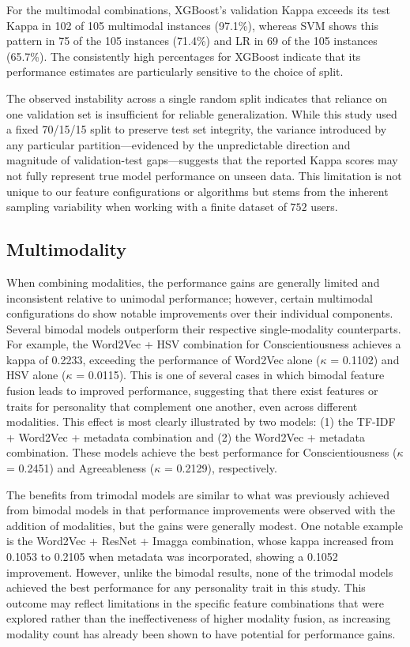 For the multimodal combinations, XGBoost's validation Kappa exceeds its test Kappa in 102 of 105 multimodal instances (97.1\%), whereas SVM shows this pattern in 75 of the 105 instances (71.4\%) and LR in 69 of the 105 instances (65.7\%). The consistently high percentages for XGBoost indicate that its performance estimates are particularly sensitive to the choice of split.

The observed instability across a single random split indicates that reliance on one validation set is insufficient for reliable generalization. While this study used a fixed 70/15/15 split to preserve test set integrity, the variance introduced by any particular partition---evidenced by the unpredictable direction and magnitude of validation-test gaps---suggests that the reported Kappa scores may not fully represent true model performance on unseen data. This limitation is not unique to our feature configurations or algorithms but stems from the inherent sampling variability when working with a finite dataset of $752$ users.

\subsection{Multimodality}
When combining modalities, the performance gains are generally limited and inconsistent relative to unimodal performance; however, certain multimodal configurations do show notable improvements over their individual components. Several bimodal models outperform their respective single-modality counterparts. For example, the Word2Vec + HSV combination for Conscientiousness achieves a kappa of 0.2233, exceeding the performance of Word2Vec alone ($\kappa$ = 0.1102) and HSV alone ($\kappa$ = 0.0115). This is one of several cases in which bimodal feature fusion leads to improved performance, suggesting that there exist features or traits for personality that complement one another, even across different modalities. This effect is most clearly illustrated by two models: (1) the TF-IDF + Word2Vec + metadata combination and (2) the Word2Vec + metadata combination. These models achieve the best performance for Conscientiousness ($\kappa$ = 0.2451) and Agreeableness ($\kappa$ = 0.2129), respectively.

The benefits from trimodal models are similar to what was previously achieved from bimodal models in that performance improvements were observed with the addition of modalities, but the gains were generally modest. One notable example is the Word2Vec + ResNet + Imagga combination, whose kappa increased from 0.1053 to 0.2105 when metadata was incorporated, showing a 0.1052 improvement. However, unlike the bimodal results, none of the trimodal models achieved the best performance for any personality trait in this study. This outcome may reflect limitations in the specific feature combinations that were explored rather than the ineffectiveness of higher modality fusion, as increasing modality count has already been shown to have potential for performance gains.


